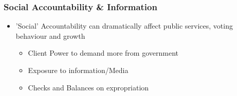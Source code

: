 \documentclass[xcolor=x11names,compress]{beamer}\usepackage[]{graphicx}\usepackage[]{color}
\renewcommand{\(}{\begin{columns}}
\renewcommand{\)}{\end{columns}}
\newcommand{\<}[1]{\begin{column}{#1}}
\renewcommand{\>}{\end{column}}
\begin{document}
\begin{frame}
\frametitle{Social Accountability \& Information}
\begin{itemize}
\item 'Social' Accountability can dramatically affect public services, voting behaviour and growth
\begin{itemize}
\item Client Power to demand more from government
\item Exposure to information/Media
\item Checks and Balances on expropriation
\end{itemize}
\end{itemize}
\end{frame}
\end{document}
